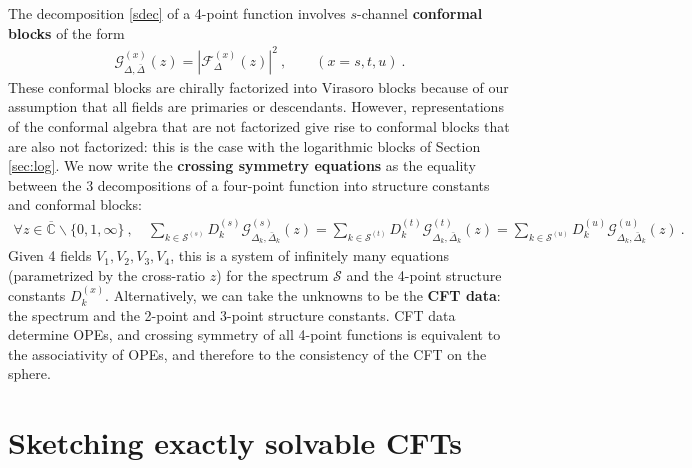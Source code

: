 \documentclass[12pt, a4paper]{article}
\newcommand{\myindex}[1]{\textbf{\boldmath #1}}
\theoremstyle{break}
\begin{document}
The decomposition \eqref{sdec} of a 4-point function involves $s$-channel \myindex{conformal blocks} of the form
\begin{align}
 \mathcal{G}^{(x)}_{\Delta,\bar\Delta}(z) = \left|\mathcal{F}_{\Delta}^{(x)}(z)\right|^2\ , \qquad (x=s,t,u)\ . 
 \label{gf2}
\end{align}
These conformal blocks are chirally factorized into Virasoro blocks because of our assumption that all fields are primaries or descendants. However, representations of the conformal algebra that are not factorized give rise to conformal blocks that are also not factorized: this is the case with the logarithmic blocks of Section \ref{sec:log}. We now write the \myindex{crossing symmetry equations} as the equality between the 3 decompositions of a four-point function into structure constants and conformal blocks:
\begin{align}
 \boxed{\forall z\in \overline{\mathbb{C}}\backslash\{0,1,\infty\} \ , \quad 
 \sum_{k\in\mathcal{S}^{(s)}} D_k^{(s)} \mathcal{G}^{(s)}_{\Delta_k,\bar\Delta_k}(z) 
 = \sum_{k\in\mathcal{S}^{(t)}} D_k^{(t)} \mathcal{G}^{(t)}_{\Delta_k,\bar\Delta_k}(z) 
 = \sum_{k\in\mathcal{S}^{(u)}} D_k^{(u)} \mathcal{G}^{(u)}_{\Delta_k,\bar\Delta_k}(z)} \ . 
 \label{seteu}
\end{align}
Given 4 fields $V_1,V_2,V_3,V_4$, this is a system of infinitely many equations (parametrized by the cross-ratio $z$) for the spectrum $\mathcal{S}$ and the 4-point structure constants $D_k^{(x)}$. Alternatively, we can take the unknowns to be the \myindex{CFT data}: the spectrum and the 2-point and 3-point structure constants. CFT data determine OPEs, and crossing symmetry of all 4-point functions is equivalent to the associativity of OPEs, and therefore to the consistency of the CFT on the sphere. 


\section{Sketching exactly solvable CFTs}\label{sec:sesc}
\end{document}
